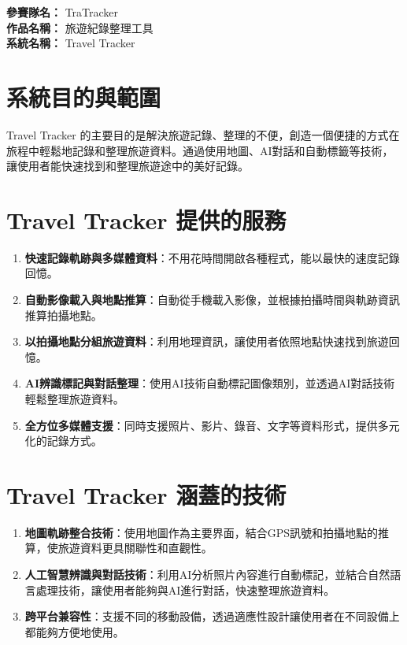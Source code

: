 \documentclass[12pt]{article}
\begin{document}
\date{}
\usetikzlibrary{automata, positioning, arrows}
{}
\renewcommand{\arraystretch}{1.45}

\noindent
\textbf{參賽隊名：} TraTracker \\
\textbf{作品名稱：} 旅遊紀錄整理工具 \\
\textbf{系統名稱：} Travel Tracker

\section{系統目的與範圍}

Travel Tracker 的主要目的是解決旅遊記錄、整理的不便，創造一個便捷的方式在旅程中輕鬆地記錄和整理旅遊資料。通過使用地圖、AI對話和自動標籤等技術，讓使用者能快速找到和整理旅遊途中的美好記錄。

\section{Travel Tracker 提供的服務}
\begin{enumerate}
  \item \textbf{快速記錄軌跡與多媒體資料}：不用花時間開啟各種程式，能以最快的速度記錄回憶。
  \item \textbf{自動影像載入與地點推算}：自動從手機載入影像，並根據拍攝時間與軌跡資訊推算拍攝地點。
  \item \textbf{以拍攝地點分組旅遊資料}：利用地理資訊，讓使用者依照地點快速找到旅遊回憶。
  \item \textbf{AI辨識標記與對話整理}：使用AI技術自動標記圖像類別，並透過AI對話技術輕鬆整理旅遊資料。
  \item \textbf{全方位多媒體支援}：同時支援照片、影片、錄音、文字等資料形式，提供多元化的記錄方式。
\end{enumerate}

\section{Travel Tracker 涵蓋的技術}
\begin{enumerate}
  \item \textbf{地圖軌跡整合技術}：使用地圖作為主要界面，結合GPS訊號和拍攝地點的推算，使旅遊資料更具關聯性和直觀性。
  \item \textbf{人工智慧辨識與對話技術}：利用AI分析照片內容進行自動標記，並結合自然語言處理技術，讓使用者能夠與AI進行對話，快速整理旅遊資料。
  \item \textbf{跨平台兼容性}：支援不同的移動設備，透過適應性設計讓使用者在不同設備上都能夠方便地使用。
\end{enumerate}
\end{document}
